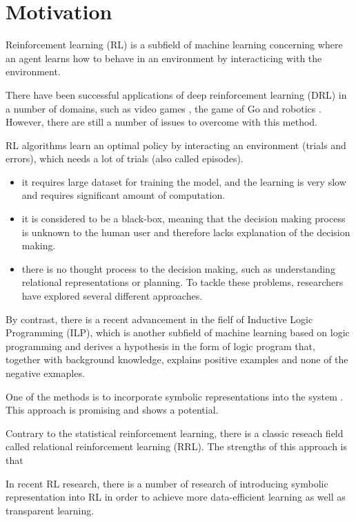 \section{Motivation}
\label{sec:motivation}
Reinforcement learning (RL) is a subfield of machine learning concerning where an agent learns how to behave in an environment by interacticing with the environment.

There have been successful applications of deep reinforcement learning (DRL) in a number of domains, 
such as video games \cite{Mnih2015}, the game of Go \cite{Silver2016} and robotics \cite{Levine2015}. 
However, there are still a number of issues to overcome with this method.

RL algorithms learn an optimal policy by interacting an environment (trials and errors), which needs a lot of trials (also called episodes). 

\begin{itemize}
    \item it requires large dataset for training the model, and the learning is very slow and requires significant amount of computation.
    \item it is considered to be a black-box, meaning that the decision making process is unknown to the human user and therefore lacks explanation of the decision making. 
    \item there is no thought process to the decision making, such as understanding relational representations or planning. To tackle these problems, researchers have explored several different approaches.
\end{itemize}

By contrast, there is a recent advancement in the fielf of Inductive Logic Programming (ILP), 
which is another subfield of machine learning based on logic programming and derives a hypothesis in the form of logic program that, together with background knowledge, explains positive examples and none of the negative exmaples. 

One of the methods is to incorporate symbolic representations into the system \cite{Garnelo2016}. This approach is promising and shows a potential.

Contrary to the statistical reinforcement learning, there is a classic reseach field called relational reinforcement learning (RRL). 
The strengths of this approach is that 

In recent RL research, there is a number of research of introducing symbolic representation into RL in order to achieve more data-efficient learning as well as transparent learning. 

